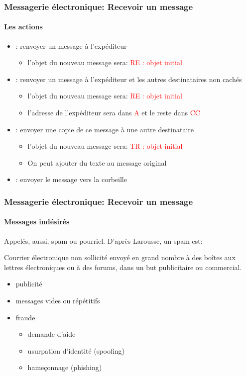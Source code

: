 \documentclass[xcolor=table]{beamer}
\begin{document}
\begin{frame}
\frametitle{Messagerie électronique: Recevoir un message}
\framesubtitle{Les actions}

\begin{itemize}
	\item {}: renvoyer un message à l'expéditeur
	\begin{itemize}
		\item l'objet du nouveau message sera: \textcolor{red}{RE : objet initial}
	\end{itemize}
	\item {}: renvoyer un message à l'expéditeur et les autres destinataires non cachés
	\begin{itemize}
		\item l'objet du nouveau message sera: \textcolor{red}{RE : objet initial}
		\item l'adresse de l'expéditeur sera dans \textcolor{red}{A} et le reste dans \textcolor{red}{CC}
	\end{itemize}
	
	\item {}: envoyer une copie de ce message à une autre destinataire  
	\begin{itemize}
		\item l'objet du nouveau message sera: \textcolor{red}{TR : objet initial}
		\item On peut ajouter du texte au message original
	\end{itemize}
	
	\item {}: envoyer le message vers la corbeille 
	
\end{itemize}


\end{frame}

\begin{frame}
\frametitle{Messagerie électronique: Recevoir un message}
\framesubtitle{Messages indésirés}

Appelés, aussi, spam ou pourriel. D'après Larousse, un spam est:
\begin{definition}
	Courrier électronique non sollicité envoyé en grand nombre à des boîtes aux lettres électroniques ou à des forums, dans un but publicitaire ou commercial.
\end{definition}

\begin{itemize}
	\item publicité
	\item messages vides ou répétitifs
	\item fraude
	\begin{itemize}
		\item demande d'aide
		\item usurpation d'identité (spoofing)
		\item hameçonnage (phishing)
	\end{itemize}
\end{itemize}


\end{frame}
\end{document}
